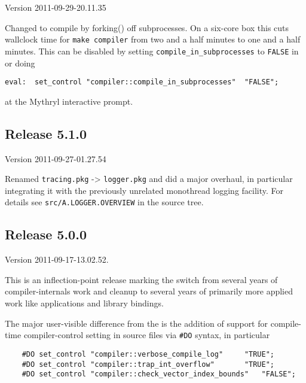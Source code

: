 Version 2011-09-29-20.11.35

Changed to compile by forking() off subprocesses.  On a 
six-core box this cuts wallclock time for {\tt make compiler} 
from two and a half minutes to one and a half minutes.  This 
can be disabled by setting {\tt compile\_in\_subprocesses} to 
{\tt FALSE} in  
or doing 
\begin{verbatim}
eval:  set_control "compiler::compile_in_subprocesses" 	"FALSE";
\end{verbatim}
at the Mythryl interactive prompt. 

\cutend*




\subsection{Release 5.1.0}
\label{section:src:release-5.1.0}

Version 2011-09-27-01.27.54 

Renamed {\tt tracing.pkg} -> {\tt logger.pkg} and did a major 
overhaul, in particular integrating it with the previously 
unrelated monothread logging facility.  For details see 
{\tt src/A.LOGGER.OVERVIEW} in the source tree. 

\cutend*



\subsection{Release 5.0.0}
\label{section:src:release-5.0.0}

Version 2011-09-17-13.02.52.

This is an inflection-point release marking the switch from several 
years of compiler-internals work and cleanup to several years of 
primarily more applied work like applications and library bindings. 


The major user-visible difference from the  
 is 
the addition of support for compile-time compiler-control setting 
in source files via {\tt #DO} syntax, in particular 

\begin{verbatim}
    #DO set_control "compiler::verbose_compile_log" 	"TRUE";
    #DO set_control "compiler::trap_int_overflow"   	"TRUE";
    #DO set_control "compiler::check_vector_index_bounds"   "FALSE";
\end{verbatim}


